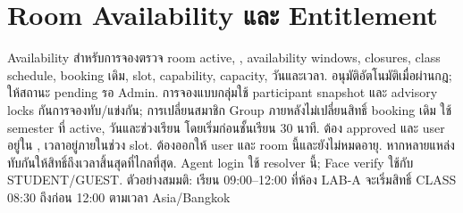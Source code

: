 \chapter{Room Availability และ Entitlement}
Availability สำหรับการจองตรวจ room active, , availability windows, closures, class schedule, booking เดิม, slot, capability, capacity, วันและเวลา.  อนุมัติอัตโนมัติเมื่อผ่านกฎ;  ให้สถานะ pending รอ Admin. การจองแบบกลุ่มใช้ participant snapshot และ advisory locks กันการจองทับ/แข่งกัน; การเปลี่ยนสมาชิก Group ภายหลังไม่เปลี่ยนสิทธิ์ booking เดิม
 ใช้ semester ที่ active, วันและช่วงเรียน โดยเริ่มก่อนชั้นเรียน 30 นาที.  ต้อง approved และ user อยู่ใน , เวลาอยู่ภายในช่วง slot.  ต้องออกให้ user และ room นี้และยังไม่หมดอายุ. หากหลายแหล่งทับกันให้สิทธิ์ถึงเวลาสิ้นสุดที่ไกลที่สุด. Agent login ใช้ resolver นี้; Face verify ใช้กับ STUDENT/GUEST. ตัวอย่างสมมติ: เรียน 09:00--12:00 ที่ห้อง LAB-A จะเริ่มสิทธิ์ CLASS 08:30 ถึงก่อน 12:00 ตามเวลา Asia/Bangkok


